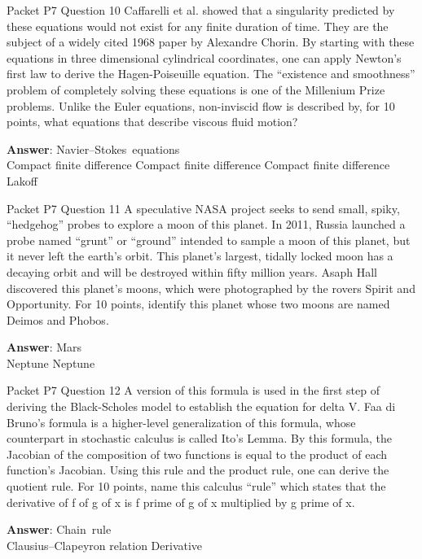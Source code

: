 \begin{frame}{Packet P7 Question 10}
Caffarelli et al. showed that a singularity predicted by these equations would not exist for any finite duration of time. They are the subject of a widely cited 1968 paper by Alexandre Chorin. By starting   with these equations in three dimensional cylindrical coordinates, one can apply Newton’s first law to derive the Hagen-Poiseuille equation. The “existence and   smoothness” problem of completely solving these equations is one of the Millenium Prize problems. Unlike the Euler equations, non-inviscid flow is described by, for 10 points, what equations that describe viscous fluid motion?    

\textbf{Answer}: Navier–Stokes\ equations\\
 Compact finite difference
 Compact finite difference
 Compact finite difference
 Lakoff
\end{frame}

\begin{frame}{Packet P7 Question 11}
A speculative NASA project seeks to send small, spiky, “hedgehog” probes to explore a moon of this planet. In 2011, Russia   launched a probe named “grunt” or “ground” intended to sample a moon of this planet, but it never left the earth’s orbit. This planet’s largest, tidally locked moon has a decaying   orbit and will be destroyed within fifty million years. Asaph Hall discovered this planet’s moons, which were photographed by the rovers Spirit and Opportunity. For 10 points, identify   this planet whose two moons are named Deimos and Phobos.  

\textbf{Answer}: Mars\\
 Neptune
 Neptune
\end{frame}

\begin{frame}{Packet P7 Question 12}
A version of this formula is used in the first step of deriving the Black-Scholes model to establish the equation for delta V. Faa di Bruno's   formula is a higher-level generalization of this formula, whose counterpart in stochastic calculus is called Ito’s Lemma. By this formula, the Jacobian of the composition   of two functions   is equal to   the product of each function’s Jacobian. Using this rule and   the product rule, one can derive the quotient rule. For 10 points, name this calculus “rule” which states that the derivative of f of g of x is f prime of g of x multiplied by g prime of x.

\textbf{Answer}: Chain\ rule\\
 Clausius–Clapeyron relation
 Derivative
\end{frame}

